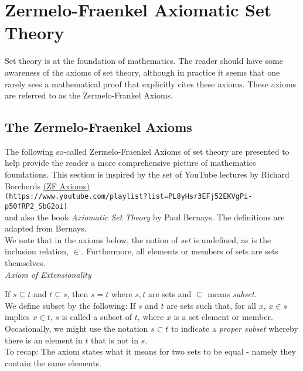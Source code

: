 \section{Zermelo-Fraenkel Axiomatic Set Theory}

Set theory is at the foundation of mathematics.  The reader should have some awareness of the axioms of set theory, although in practice it seems that one rarely sees a mathematical proof that explicitly cites these axioms.  These axioms are referred to as the Zermelo-Frankel Axioms.

\subsection{The Zermelo-Fraenkel Axioms}

The following so-called Zermelo-Fraenkel Axioms of set theory are presented to help provide the reader a more comprehensive picture of mathematics foundations.  This section is inspired by the set of YouTube lectures by Richard Borcherds \href{https://www.youtube.com/playlist?list=PL8yHsr3EFj52EKVgPi-p50fRP2_SbG2oi}{(ZF Axioms)}\\
\verb+(https://www.youtube.com/playlist?list=PL8yHsr3EFj52EKVgPi-p50fRP2_SbG2oi)+\\ and also the book \textit{Axiomatic Set Theory} by Paul Bernays.  The definitions are adapted from Bernays.\\

We note that in the axioms below, the notion of \textit{set} is undefined, as is the inclusion relation, $\in$.  Furthermore, all elements or members of sets are sets themselves.\\

\textit{Axiom of Extensionality}

If $s \subseteq t$ and $t \subseteq s$, then $s=t$ where $s,t$ are sets and $\subseteq$ means \textit{subset}.\\  

We define subset by the following:  If $s$ and $t$ are sets such that, for all $x$, $x \in s$ implies $x \in t$, $s$ is called a subset of $t$, where $x$ is a set element or member.  Occasionally, we might use the notation $s \subset t$ to indicate a \textit{proper subset} whereby there is an element in $t$ that is not in $s$. \\

To recap:  The axiom states what it means for two sets to be equal - namely they contain the same elements.\\

